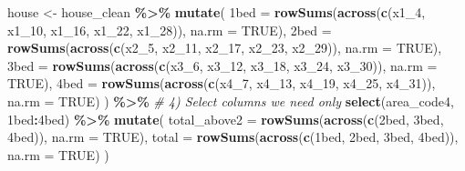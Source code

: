 \documentclass[
]{article}
\newenvironment{Shaded}{\begin{snugshade}}{\end{snugshade}}
\newcommand{\AttributeTok}[1]{\textcolor[rgb]{0.13,0.29,0.53}{#1}}
\newcommand{\CommentTok}[1]{\textcolor[rgb]{0.56,0.35,0.01}{\textit{#1}}}
\newcommand{\ConstantTok}[1]{\textcolor[rgb]{0.56,0.35,0.01}{#1}}
\newcommand{\FunctionTok}[1]{\textcolor[rgb]{0.13,0.29,0.53}{\textbf{#1}}}
\newcommand{\NormalTok}[1]{#1}
\newcommand{\OtherTok}[1]{\textcolor[rgb]{0.56,0.35,0.01}{#1}}
\newcommand{\SpecialCharTok}[1]{\textcolor[rgb]{0.81,0.36,0.00}{\textbf{#1}}}
\newcommand{\StringTok}[1]{\textcolor[rgb]{0.31,0.60,0.02}{#1}}
\begin{document}
\begin{Shaded}
\begin{Highlighting}[]
\NormalTok{house }\OtherTok{\textless{}{-}}\NormalTok{ house\_clean }\SpecialCharTok{\%\textgreater{}\%}
  \FunctionTok{mutate}\NormalTok{(}
    \StringTok{\textasciigrave{}}\AttributeTok{1bed}\StringTok{\textasciigrave{}} \OtherTok{=} \FunctionTok{rowSums}\NormalTok{(}\FunctionTok{across}\NormalTok{(}\FunctionTok{c}\NormalTok{(x1\_4, x1\_10, x1\_16, x1\_22, x1\_28)), }\AttributeTok{na.rm =} \ConstantTok{TRUE}\NormalTok{),}
    \StringTok{\textasciigrave{}}\AttributeTok{2bed}\StringTok{\textasciigrave{}} \OtherTok{=} \FunctionTok{rowSums}\NormalTok{(}\FunctionTok{across}\NormalTok{(}\FunctionTok{c}\NormalTok{(x2\_5, x2\_11, x2\_17, x2\_23, x2\_29)), }\AttributeTok{na.rm =} \ConstantTok{TRUE}\NormalTok{),}
    \StringTok{\textasciigrave{}}\AttributeTok{3bed}\StringTok{\textasciigrave{}} \OtherTok{=} \FunctionTok{rowSums}\NormalTok{(}\FunctionTok{across}\NormalTok{(}\FunctionTok{c}\NormalTok{(x3\_6, x3\_12, x3\_18, x3\_24, x3\_30)), }\AttributeTok{na.rm =} \ConstantTok{TRUE}\NormalTok{),}
    \StringTok{\textasciigrave{}}\AttributeTok{4bed}\StringTok{\textasciigrave{}} \OtherTok{=} \FunctionTok{rowSums}\NormalTok{(}\FunctionTok{across}\NormalTok{(}\FunctionTok{c}\NormalTok{(x4\_7, x4\_13, x4\_19, x4\_25, x4\_31)), }\AttributeTok{na.rm =} \ConstantTok{TRUE}\NormalTok{)}
\NormalTok{  ) }\SpecialCharTok{\%\textgreater{}\%}
\CommentTok{\# 4) Select columns we need only }
  \FunctionTok{select}\NormalTok{(area\_code4, }\StringTok{\textasciigrave{}}\AttributeTok{1bed}\StringTok{\textasciigrave{}}\SpecialCharTok{:}\StringTok{\textasciigrave{}}\AttributeTok{4bed}\StringTok{\textasciigrave{}}\NormalTok{) }\SpecialCharTok{\%\textgreater{}\%}
  \FunctionTok{mutate}\NormalTok{(}
    \AttributeTok{total\_above2 =} \FunctionTok{rowSums}\NormalTok{(}\FunctionTok{across}\NormalTok{(}\FunctionTok{c}\NormalTok{(}\StringTok{\textasciigrave{}}\AttributeTok{2bed}\StringTok{\textasciigrave{}}\NormalTok{, }\StringTok{\textasciigrave{}}\AttributeTok{3bed}\StringTok{\textasciigrave{}}\NormalTok{, }\StringTok{\textasciigrave{}}\AttributeTok{4bed}\StringTok{\textasciigrave{}}\NormalTok{)), }\AttributeTok{na.rm =} \ConstantTok{TRUE}\NormalTok{),}
    \AttributeTok{total        =} \FunctionTok{rowSums}\NormalTok{(}\FunctionTok{across}\NormalTok{(}\FunctionTok{c}\NormalTok{(}\StringTok{\textasciigrave{}}\AttributeTok{1bed}\StringTok{\textasciigrave{}}\NormalTok{, }\StringTok{\textasciigrave{}}\AttributeTok{2bed}\StringTok{\textasciigrave{}}\NormalTok{, }\StringTok{\textasciigrave{}}\AttributeTok{3bed}\StringTok{\textasciigrave{}}\NormalTok{, }\StringTok{\textasciigrave{}}\AttributeTok{4bed}\StringTok{\textasciigrave{}}\NormalTok{)), }\AttributeTok{na.rm =} \ConstantTok{TRUE}\NormalTok{)}
\NormalTok{  )}


\end{Highlighting}
\end{Shaded}
\end{document}
